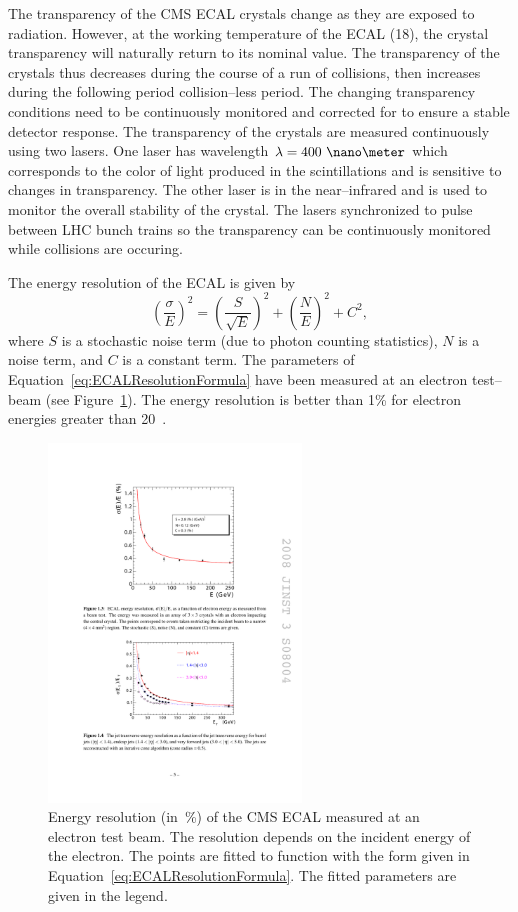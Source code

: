 The transparency of the CMS ECAL crystals change as they are exposed to
radiation.  However, at the working temperature of the ECAL (18\celsius), the
crystal transparency will naturally return to its nominal value.  The
transparency of the crystals thus decreases during the course of a run of
collisions, then increases during the following period collision--less period.
The changing transparency conditions need to be continuously monitored and
corrected for to ensure a stable detector response.  The transparency of the
crystals are measured continuously using two lasers. One laser has wavelength
$\lambda = 400~\nano\meter$ which corresponds to the color of light produced in
the scintillations and is sensitive to changes in transparency.  The other laser
is in the near--infrared and is used to monitor the overall stability of the
crystal.  The lasers synchronized to pulse between LHC bunch trains so the
transparency can be continuously monitored while collisions are occuring.

The energy resolution of the ECAL is given by
\begin{equation}
  \left(\frac{\sigma}{E}\right)^2 = \left(\frac{S}{\sqrt E}\right)^2 + 
  \left(\frac{N}{E}\right)^2 + C^2,
  \label{eq:ECALResolutionFormula}
\end{equation}
where $S$ is a stochastic noise term (due to photon counting statistics), $N$ is
a noise term, and $C$ is a constant term.  The parameters of
Equation~\ref{eq:ECALResolutionFormula} have been measured at an electron
test--beam (see Figure~\ref{fig:ECALResolution}).  The energy resolution is
better than 1\% for electron energies greater than 20~\GeV.  
\begin{figure}
  \centering
  \includegraphics[width=0.6\textwidth]{detector_chapter/figures/ECAL_Energy_resolution.pdf}
  \caption[Energy resolution of the CMS ECAL]{Energy resolution (in~\%) of the
  CMS ECAL measured at an electron test beam.  The resolution depends on the
  incident energy of the electron.  The points are fitted to function with the
  form given in Equation~\ref{eq:ECALResolutionFormula}.  The fitted parameters
  are given in the legend.}
  \label{fig:ECALResolution}
\end{figure}

